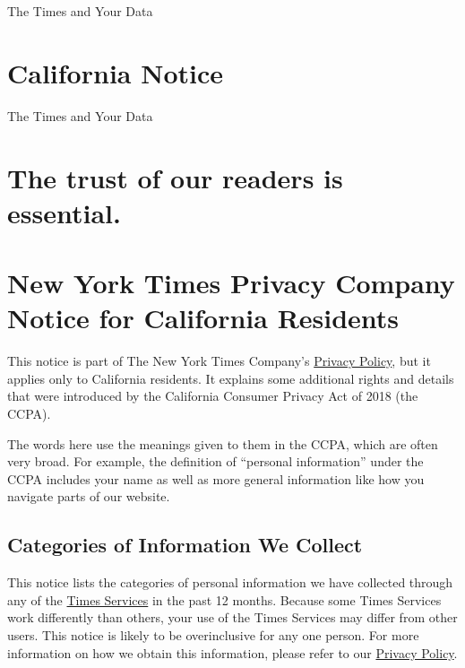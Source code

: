 The Times and Your Data

\hypertarget{california-notice}{%
\section{California Notice}\label{california-notice}}

The Times and Your Data

\hypertarget{the-trust-of-our-readers-is-essential}{%
\section{The trust of our readers is
essential.}\label{the-trust-of-our-readers-is-essential}}

\hypertarget{new-york-times-privacy-company-notice-for-california-residents}{%
\section{New York Times Privacy Company Notice for California
Residents}\label{new-york-times-privacy-company-notice-for-california-residents}}

This notice is part of The New York Times Company's
\href{/privacy/privacy-policy}{Privacy Policy}, but it applies only to
California residents. It explains some additional rights and details
that were introduced by the California Consumer Privacy Act of 2018 (the
CCPA).

The words here use the meanings given to them in the CCPA, which are
often very broad. For example, the definition of ``personal
information'' under the CCPA includes your name as well as more general
information like how you navigate parts of our website.

\hypertarget{categories-of-information-we-collect}{%
\subsection{Categories of Information We
Collect}\label{categories-of-information-we-collect}}

This notice lists the categories of personal information we have
collected through any of the
\href{http://www.nytimes.com/privacy/privacy-policy}{Times Services} in
the past 12 months. Because some Times Services work differently than
others, your use of the Times Services may differ from other users. This
notice is likely to be overinclusive for any one person. For more
information on how we obtain this information, please refer to our
\href{http://www.nytimes.com/privacy/privacy-policy\#what-information-do-we-gather-about-you}{Privacy
Policy}.

